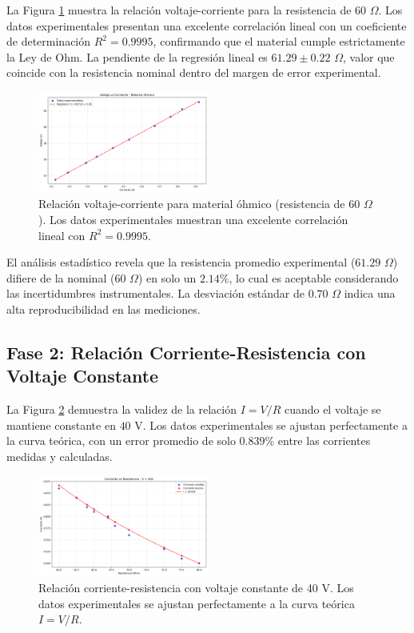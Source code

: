 \documentclass[11pt,twocolumn]{article}
\begin{document}
La Figura \ref{fig:ohmico} muestra la relación voltaje-corriente para la resistencia de 60 $\Omega$. Los datos experimentales presentan una excelente correlación lineal con un coeficiente de determinación $R^2 = 0.9995$, confirmando que el material cumple estrictamente la Ley de Ohm. La pendiente de la regresión lineal es $61.29 \pm 0.22$ $\Omega$, valor que coincide con la resistencia nominal dentro del margen de error experimental.

\begin{figure}[H]
\centering
\includegraphics[width=0.5\textwidth]{graficas/voltaje_vs_corriente_ohmico.png}
\caption{Relación voltaje-corriente para material óhmico (resistencia de 60 $\Omega$). Los datos experimentales muestran una excelente correlación lineal con $R^2 = 0.9995$.}
\label{fig:ohmico}
\end{figure}

El análisis estadístico revela que la resistencia promedio experimental ($61.29$ $\Omega$) difiere de la nominal ($60$ $\Omega$) en solo un $2.14\%$, lo cual es aceptable considerando las incertidumbres instrumentales. La desviación estándar de $0.70$ $\Omega$ indica una alta reproducibilidad en las mediciones.

\subsection*{Fase 2: Relación Corriente-Resistencia con Voltaje Constante}

La Figura \ref{fig:corriente_resistencia} demuestra la validez de la relación $I = V/R$ cuando el voltaje se mantiene constante en $40$ V. Los datos experimentales se ajustan perfectamente a la curva teórica, con un error promedio de solo $0.839\%$ entre las corrientes medidas y calculadas.

\begin{figure}[H]
\centering
\includegraphics[width=0.5\textwidth]{graficas/corriente_vs_resistencia.png}
\caption{Relación corriente-resistencia con voltaje constante de 40 V. Los datos experimentales se ajustan perfectamente a la curva teórica $I = V/R$.}
\label{fig:corriente_resistencia}
\end{figure}
\end{document}
